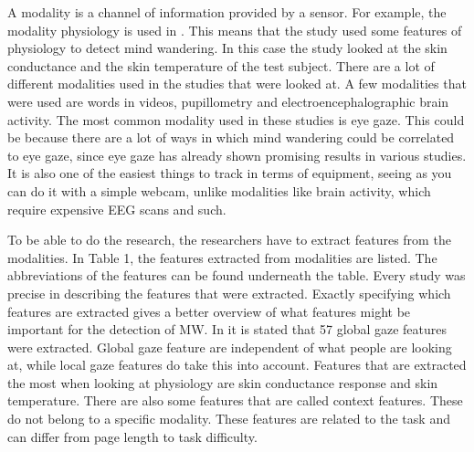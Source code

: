 A modality is a channel of information provided by a sensor. For example, the modality physiology is used in \cite{Blanchard2014AutomatedLearning}. This means that the study used some features of physiology to detect mind wandering. In this case the study looked at the skin conductance and the skin temperature of the test subject. There are a lot of different modalities used in the studies that were looked at. A few modalities that were used are words in videos, pupillometry and electroencephalographic brain activity. The most common modality used in these studies is eye gaze. This could be because there are a lot of ways in which mind wandering could be correlated to eye gaze, since eye gaze has already shown promising results in various studies. It is also one of the easiest things to track in terms of equipment, seeing as you can do it with a simple webcam, unlike modalities like brain activity, which require expensive EEG scans and such.

To be able to do the research, the researchers have to extract features from the modalities. In Table 1, the features extracted from modalities are listed. The abbreviations of the features can be found underneath the table. Every study was precise in describing the features that were extracted. Exactly specifying which features are extracted gives a better overview of what features might be important for the detection of MW. In \cite{Hutt2017OutClassroom} it is stated that 57 global gaze features were extracted. Global gaze feature are independent of what people are looking at, while local gaze features do take this into account. Features that are extracted the most when looking at physiology are skin conductance response and skin temperature. There are also some features that are called context features. These do not belong to a specific modality. These features are related to the task and can differ from page length to task difficulty.